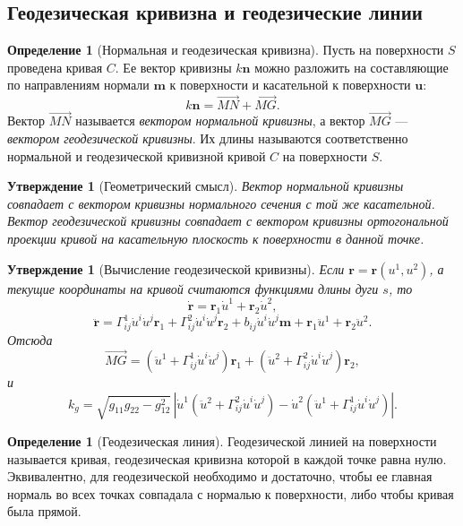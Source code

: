 \documentclass[12pt,a4paper]{article}
\newtheorem{proposition}[theorem]{Утверждение}
\theoremstyle{definition}
\newtheorem{definition}[theorem]{Определение}
\begin{document}
\subsection{Геодезическая кривизна и геодезические линии}

\begin{definition}[Нормальная и геодезическая кривизна]
Пусть на поверхности $S$ проведена кривая $C$. Ее вектор кривизны $k\mathbf{n}$ можно разложить на составляющие по направлениям нормали $\mathbf{m}$ к поверхности и касательной к поверхности $\mathbf{u}$:
\[
k\mathbf{n} = \vec{MN} + \vec{MG}.
\]
Вектор $\vec{MN}$ называется \textit{вектором нормальной кривизны}, а вектор $\vec{MG}$ --- \textit{вектором геодезической кривизны}. Их длины называются соответственно нормальной и геодезической кривизной кривой $C$ на поверхности $S$.
\end{definition}

\begin{proposition}[Геометрический смысл]
Вектор нормальной кривизны совпадает с вектором кривизны нормального сечения с той же касательной. Вектор геодезической кривизны совпадает с вектором кривизны ортогональной проекции кривой на касательную плоскость к поверхности в данной точке.
\end{proposition}

\begin{proposition}[Вычисление геодезической кривизны]
Если $\mathbf{r}=\mathbf{r}(u^1,u^2)$, а текущие координаты на кривой считаются функциями длины дуги $s$, то
\[
\dot{\mathbf{r}} = \mathbf{r}_1 \dot{u}^1 + \mathbf{r}_2 \dot{u}^2,
\]
\[
\ddot{\mathbf{r}} = \Gamma_{ij}^1 \dot{u}^i \dot{u}^j \mathbf{r}_1 + \Gamma_{ij}^2 \dot{u}^i \dot{u}^j \mathbf{r}_2 + b_{ij} \dot{u}^i \dot{u}^j \mathbf{m} + \mathbf{r}_1 \ddot{u}^1 + \mathbf{r}_2 \ddot{u}^2.
\]
Отсюда
\[
\vec{MG} = \left( \ddot{u}^1 + \Gamma_{ij}^1 \dot{u}^i \dot{u}^j \right) \mathbf{r}_1 + \left( \ddot{u}^2 + \Gamma_{ij}^2 \dot{u}^i \dot{u}^j \right) \mathbf{r}_2,
\]
и
\[
k_g = \sqrt{g_{11}g_{22} - g_{12}^2} \, \left| \dot{u}^1 \left( \ddot{u}^2 + \Gamma_{ij}^2 \dot{u}^i \dot{u}^j \right) - \dot{u}^2 \left( \ddot{u}^1 + \Gamma_{ij}^1 \dot{u}^i \dot{u}^j \right) \right|.
\]
\end{proposition}

\begin{definition}[Геодезическая линия]
Геодезической линией на поверхности называется кривая, геодезическая кривизна которой в каждой точке равна нулю. Эквивалентно, для геодезической необходимо и достаточно, чтобы ее главная нормаль во всех точках совпадала с нормалью к поверхности, либо чтобы кривая была прямой.
\end{definition}
\end{document}
